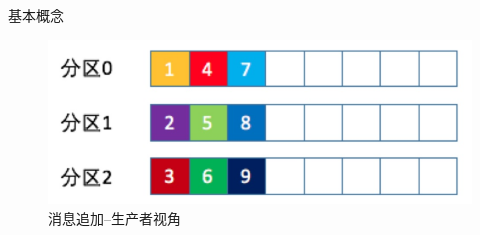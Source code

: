 \begin{frame}[plain,t]{基本概念} %
		 \\  
	\vspace{2ex}
	\begin{figure}
		\centering
		\includegraphics[width=0.9\linewidth]{image/0104}
		\caption{消息追加--生产者视角}
		\label{fig:0104}
	\end{figure}
	
	
\end{frame}

